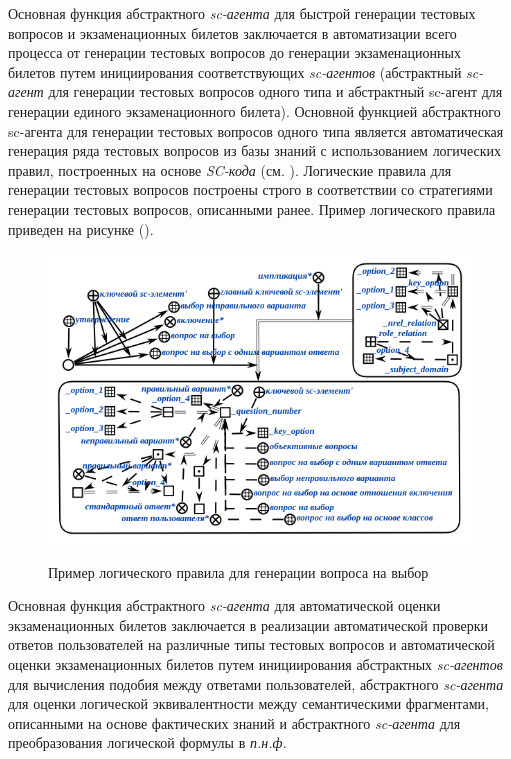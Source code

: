 Основная функция абстрактного \textit{sc-агента} для быстрой генерации тестовых вопросов и экзаменационных билетов заключается в автоматизации всего процесса от генерации тестовых вопросов до генерации экзаменационных билетов путем инициирования соответствующих \textit{sc-агентов} (абстрактный \textit{sc-агент} для генерации тестовых вопросов одного типа и абстрактный sc-агент для генерации единого экзаменационного билета). Основной функцией абстрактного sc-агента для генерации тестовых вопросов одного типа является автоматическая генерация ряда тестовых вопросов из базы знаний с использованием логических правил, построенных на основе \textit{SC-кода} (см. ). Логические правила для генерации тестовых вопросов построены строго в соответствии со стратегиями генерации тестовых вопросов, описанными ранее. Пример логического правила приведен на рисунке (\textit{}).

\begin{figure}[H]
	\caption{Пример логического правила для генерации вопроса на выбор}
	\includegraphics[scale=1]{author/part7/figures/logic_rule_example.png}
	\label{fig:LRE_example}
\end{figure}

Основная функция абстрактного \textit{sc-агента} для автоматической оценки экзаменационных билетов заключается в реализации автоматической проверки ответов пользователей на различные типы тестовых вопросов и автоматической оценки экзаменационных билетов путем инициирования абстрактных \textit{sc-агентов} для вычисления подобия между ответами пользователей, абстрактного \textit{sc-агента} для оценки логической эквивалентности между семантическими фрагментами, описанными на основе фактических знаний и абстрактного \textit{sc-агента} для преобразования логической формулы в \textit{п.н.ф.}
